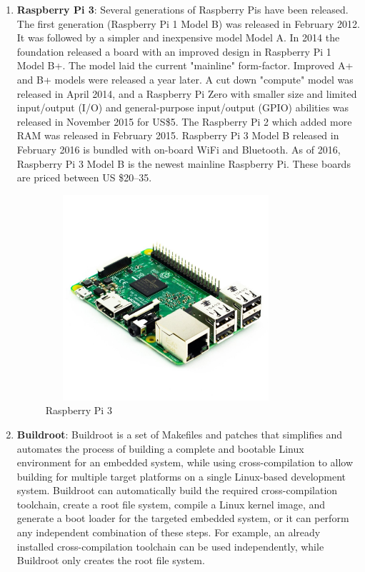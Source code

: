 \begin{enumerate}
\begin{figure}[ht]
	\end{figure}
	\item \textbf{Raspberry Pi 3}: Several generations of Raspberry Pis have been released. The first generation (Raspberry Pi 1 Model B) was released in February 2012. It was followed by a simpler and inexpensive model Model A. In 2014 the foundation released a board with an improved design in Raspberry Pi 1 Model B+. The model laid the current "mainline" form-factor. Improved A+ and B+ models were released a year later. A cut down "compute" model was released in April 2014, and a Raspberry Pi Zero with smaller size and limited input/output (I/O) and general-purpose input/output (GPIO) abilities was released in November 2015 for US\$5. The Raspberry Pi 2 which added more RAM was released in February 2015. Raspberry Pi 3 Model B released in February 2016 is bundled with on-board WiFi and Bluetooth. As of 2016, Raspberry Pi 3 Model B is the newest mainline Raspberry Pi. These boards are priced between US \$20–35.
	\begin{figure}[H]
	        \centering
	        \includegraphics[width=3.5in, height=3in]{images/raspberry_pi.png}
	        \caption{Raspberry Pi 3}
	\end{figure}
	\item \textbf{Buildroot}: Buildroot is a set of Makefiles and patches that simplifies and automates the process of building a complete and bootable Linux environment for an embedded system, while using cross-compilation to allow building for multiple target platforms on a single Linux-based development system. Buildroot can automatically build the required cross-compilation toolchain, create a root file system, compile a Linux kernel image, and generate a boot loader for the targeted embedded system, or it can perform any independent combination of these steps. For example, an already installed cross-compilation toolchain can be used independently, while Buildroot only creates the root file system. \\

\end{enumerate}
